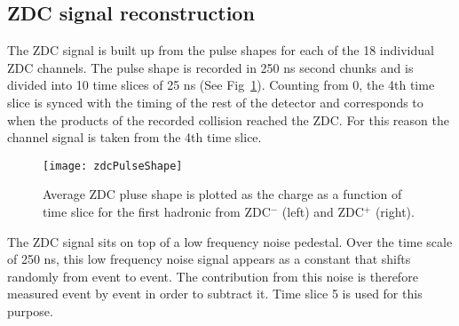     \subsection{ZDC signal reconstruction}
      The ZDC signal is built up from the pulse shapes for each of the 
        18 individual ZDC channels. 
      The pulse shape is recorded in 250 ns second chunks and is divided into
        10 time slices of 25 ns (See Fig~\ref{fig:zdcPulseShape}).
      Counting from 0, the 4th time slice is synced with the timing of the rest
        of the detector and corresponds to when the products of the recorded 
        collision reached the ZDC.
      For this reason the channel signal is taken from the 4th time slice.
      \begin{figure}[h]
        \centering
        \texttt{[image: zdcPulseShape]}
        \caption{Average ZDC pluse shape is plotted as the charge as a function
          of time slice for the first hadronic from ZDC$^{-}$ (left) and 
          ZDC$^{+}$ (right).}
        \label{fig:zdcPulseShape}
      \end{figure}

      The ZDC signal sits on top of a low frequency noise pedestal. 
      Over the time scale of 250 ns, this low frequency noise signal appears
        as a constant that shifts randomly from event to event.
      The contribution from this noise is therefore measured event by event
        in order to subtract it.
      Time slice 5 is used for this purpose.

